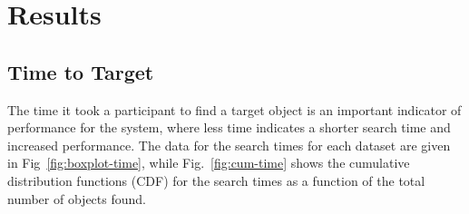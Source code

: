 \documentclass[runningheads]{llncs}
\begin{document}
\section{Results}


\subsection{Time to Target}

The time it took a participant to find a target object is an important indicator of performance for the system, where less time indicates a shorter search time and increased performance.
The data for the search times for each dataset are given in Fig~\ref{fig:boxplot-time}, while Fig.~\ref{fig:cum-time} shows the cumulative distribution functions (CDF) for the search times as a function of the total number of objects found.
\end{document}
